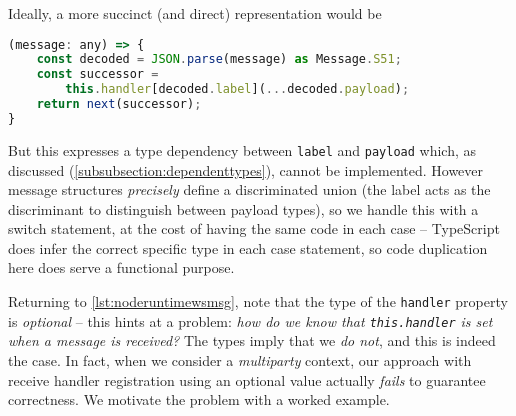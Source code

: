 Ideally, a more succinct (and direct) representation would be
\begin{lstlisting}[language=javascript]
(message: any) => {
	const decoded = JSON.parse(message) as Message.S51;
	const successor = 
		this.handler[decoded.label](...decoded.payload);
	return next(successor);
}
\end{lstlisting}

But this expresses a type dependency between \texttt{label}
and \texttt{payload} which, as discussed 
(\cref{subsubsection:dependenttypes}), cannot be implemented.
However message structures \textit{precisely} 
define a discriminated union 
(the label acts as the discriminant 
to distinguish between payload types),
so we handle this with a switch statement,
at the cost of having the same code in each case --
TypeScript does infer the correct specific type in each case statement,
so code duplication here does serve a functional purpose.

Returning to \cref{lst:noderuntimewsmsg},
note that the type of the \texttt{handler} property is \textit{optional}
-- this hints at a problem: 
\textit{how do we know that \texttt{this.handler} is set when
a message is received?} The types imply that we \textit{do not},
and this is indeed the case.
In fact, when we consider a \textit{multiparty} context,
our approach with receive handler registration 
using an optional value actually \textit{fails} to guarantee correctness.
We motivate the problem with a worked
example.

